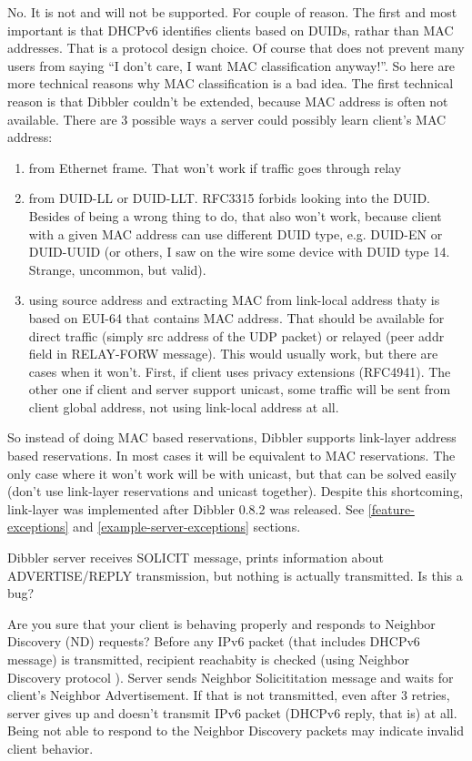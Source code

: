 \A No. It is not and will not be supported. For couple of reason. The
first and most important is that DHCPv6 identifies clients based on
DUIDs, rathar than MAC addresses. That is a protocol design choice. Of
course that does not prevent many users from saying ``I don't care, I
want MAC classification anyway!''. So here are more technical reasons
why MAC classification is a bad idea. The first technical reason is
that Dibbler couldn't be extended, because MAC address is often not
available. There are 3 possible ways a server could possibly
learn client's MAC address:
\begin{enumerate}
\item from Ethernet frame. That won't work if traffic goes through
relay
\item from DUID-LL or DUID-LLT. RFC3315 forbids looking into the DUID.
Besides of being a wrong thing to do, that also won't work, because
client with a given MAC address can use different DUID type, e.g.
DUID-EN or DUID-UUID (or others, I saw on the wire some device with DUID
type 14. Strange, uncommon, but valid).
\item using source address and extracting MAC from link-local address
thaty is based on EUI-64 that contains MAC address. That should be
available for direct traffic (simply src address of the UDP packet) or
relayed (peer addr field in RELAY-FORW message). This would usually
work, but there are cases when it won't. First, if client uses privacy
extensions (RFC4941). The other one if client and server support
unicast, some traffic will be sent from client global address, not
using link-local address at all.
\end{enumerate}

So instead of doing MAC based reservations, Dibbler supports
link-layer address based reservations. In most cases it will be
equivalent to MAC reservations. The only case where it won't work will
be with unicast, but that can be solved easily (don't use link-layer
reservations and unicast together). Despite this shortcoming,
link-layer was implemented after Dibbler 0.8.2 was
released. See \ref{feature-exceptions}
and \ref{example-server-exceptions} sections.

\Q Dibbler server receives SOLICIT message, prints information about
ADVERTISE/REPLY transmission, but nothing is actually transmitted. Is
this a bug?

\A Are you sure that your client is behaving properly and responds to
Neighbor Discovery (ND) requests? Before any IPv6 packet (that
includes DHCPv6 message) is transmitted, recipient reachabity is
checked (using Neighbor Discovery protocol \cite{rfc4861}). Server
sends Neighbor Solicititation message and waits for client's Neighbor
Advertisement. If that is not transmitted, even after 3 retries,
server gives up and doesn't transmit IPv6 packet (DHCPv6 reply, that
is) at all. Being not able to respond to the Neighbor Discovery
packets may indicate invalid client behavior.

